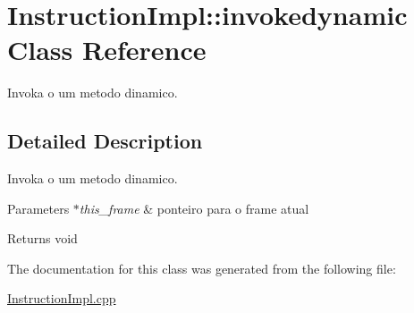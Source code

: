 \hypertarget{class_instruction_impl_1_1invokedynamic}{}\section{Instruction\+Impl\+:\+:invokedynamic Class Reference}
\label{class_instruction_impl_1_1invokedynamic}


Invoka o um metodo dinamico.  




\subsection{Detailed Description}
Invoka o um metodo dinamico. 


\begin{DoxyParams}{Parameters}
{\em $\ast$this\+\_\+frame} & ponteiro para o frame atual \\
\hline
\end{DoxyParams}
\begin{DoxyReturn}{Returns}
void 
\end{DoxyReturn}


The documentation for this class was generated from the following file\+:\begin{DoxyCompactItemize}
\item 
\hyperlink{_instruction_impl_8cpp}{Instruction\+Impl.\+cpp}\end{DoxyCompactItemize}
